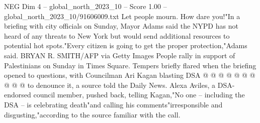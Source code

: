 \begin{textsample}{NEG Dim 4 – global\_north\_2023\_10 – Score 1.00 – global\_north\_2023\_10/91606009.txt}
Let people mourn.
How dare you!"In a briefing with city officials on Sunday, Mayor Adams said the NYPD has not heard of any threats to New York but would send additional resources to potential hot spots."Every citizen is going to get the proper protection,"Adams said.
BRYAN R.
SMITH/AFP via Getty Images People rally in support of Palestinians on Sunday in Times Square.
Tempers briefly flared when the briefing opened to questions, with Councilman Ari Kagan blasting DSA @ @ @ @ @ @ @ @ @ @ to denounce it, a source told the Daily News.
Alexa Aviles, a DSA-endorsed council member, pushed back, telling Kagan,"No one -- including the DSA -- is celebrating death"and calling his comments"irresponsible and disgusting,"according to the source familiar with the call.

\end{textsample}
